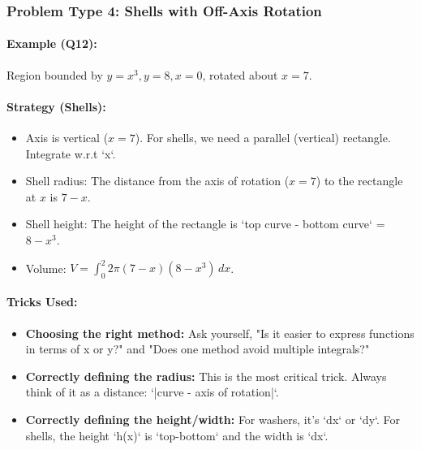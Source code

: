 \documentclass{article}
\begin{document}
\subsubsection{Problem Type 4: Shells with Off-Axis Rotation}
\paragraph{Example (Q12):} Region bounded by $y=x^3, y=8, x=0$, rotated about $x=7$.
\paragraph{Strategy (Shells):}
\begin{itemize}
    \item Axis is vertical ($x=7$). For shells, we need a parallel (vertical) rectangle. Integrate w.r.t `x`.
    \item Shell radius: The distance from the axis of rotation ($x=7$) to the rectangle at $x$ is $7-x$.
    \item Shell height: The height of the rectangle is `top curve - bottom curve` = $8-x^3$.
    \item Volume: $V = \int_0^2 2\pi (7-x)(8-x^3) \,dx$.
\end{itemize}
\paragraph{Tricks Used:}
\begin{itemize}
    \item \textbf{Choosing the right method:} Ask yourself, "Is it easier to express functions in terms of x or y?" and "Does one method avoid multiple integrals?"
    \item \textbf{Correctly defining the radius:} This is the most critical trick. Always think of it as a distance: `|curve - axis of rotation|`.
    \item \textbf{Correctly defining the height/width:} For washers, it's `dx` or `dy`. For shells, the height `h(x)` is `top-bottom` and the width is `dx`.
\end{itemize}
\end{document}
